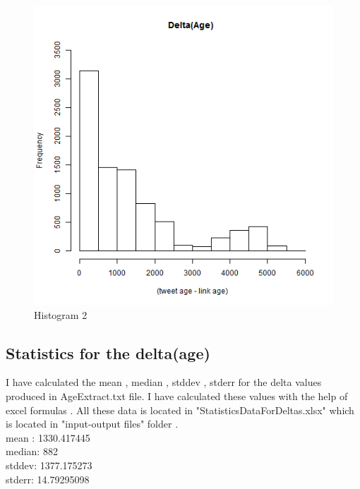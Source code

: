 \documentclass[12pt]{Report}
\begin{document}
\newpage
\begin{figure}[ht]    
    \begin{center}
        \includegraphics[scale=0.60]{delta--age.png}
        \caption{Histogram 2}
        \label{Count of number of redirects}
    \end{center}
\end{figure}
\newpage



\subsection{Statistics for the delta(age) }

I have calculated the mean , median , stddev , stderr for the delta values produced in AgeExtract.txt file. I have calculated these values with the help of excel formulas . All these data is located in "StatisticsDataForDeltas.xlsx" which is located in "input-output files" folder .\\

mean :	1330.417445\\
median: 	882\\
stddev: 	1377.175273\\
stderr:	14.79295098\\






  
\end{document}
